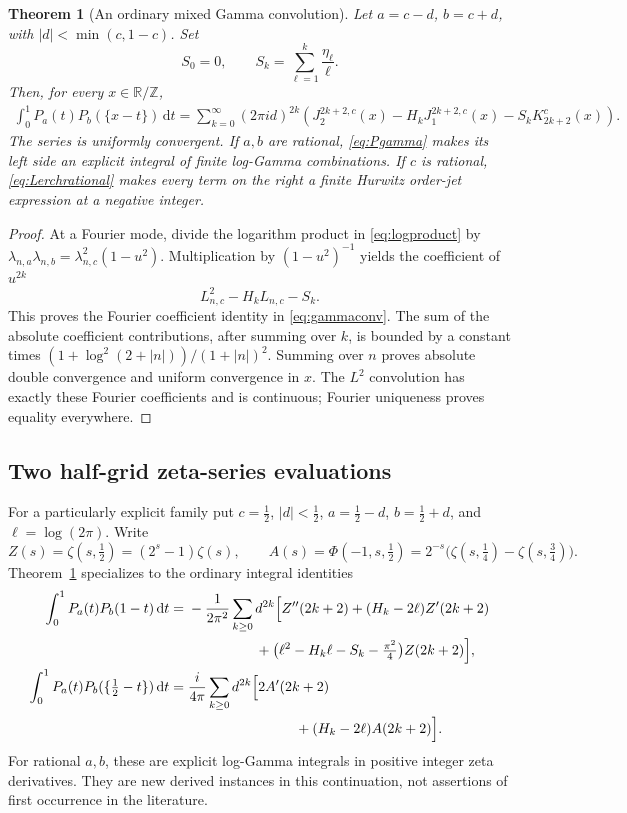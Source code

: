 \documentclass[11pt,a4paper]{article}
\numberwithin{equation}{section}
\newtheorem{theorem}{Theorem}[section]
\theoremstyle{definition}\newtheorem{definition}[theorem]{Definition}
\theoremstyle{remark}\newtheorem{remark}[theorem]{Remark}
\newcommand{\dd}{\,\mathrm d}
\newcommand{\T}{\mathbb R/\mathbb Z}
\begin{document}
\begin{theorem}[An ordinary mixed Gamma convolution]\label{thm:gammaconv}
Let $a=c-d$, $b=c+d$, with $|d|<\min(c,1-c)$. Set
\begin{equation}
 S_0=0,\qquad S_k=\sum_{\ell=1}^k\frac{\eta_\ell}{\ell}.
 \label{eq:Sk}
\end{equation}
Then, for every $x\in\T$,
\begin{align}
 \int_0^1P_a(t)P_b(\{x-t\})\dd t
   =\sum_{k=0}^\infty(2\pi id)^{2k}
       \left(J_2^{2k+2,c}(x)-H_kJ_1^{2k+2,c}(x)
                          -S_kK_{2k+2}^c(x)\right).
 \label{eq:gammaconv}
\end{align}
The series is uniformly convergent. If $a,b$ are rational,
\eqref{eq:Pgamma} makes its left side an explicit integral of finite
log-Gamma combinations. If $c$ is rational,
\eqref{eq:Lerchrational} makes every term on the right a finite
Hurwitz order-jet expression at a negative integer.
\end{theorem}
\begin{proof}
At a Fourier mode, divide the logarithm product in
\eqref{eq:logproduct} by
$\lambda_{n,a}\lambda_{n,b}=\lambda_{n,c}^2(1-u^2)$.
Multiplication by $(1-u^2)^{-1}$ yields the coefficient of $u^{2k}$
\[
 L_{n,c}^2-H_kL_{n,c}-S_k.
\]
This proves the Fourier coefficient identity in \eqref{eq:gammaconv}.
The sum of the absolute coefficient contributions, after summing over
$k$, is bounded by a constant times
$(1+\log^2(2+|n|))/(1+|n|)^2$. Summing over $n$ proves absolute
double convergence and uniform convergence in $x$. The $L^2$
convolution has exactly these Fourier coefficients and is continuous;
Fourier uniqueness proves equality everywhere.
\end{proof}

\subsection{Two half-grid zeta-series evaluations}
For a particularly explicit family put $c=\tfrac12$, $|d|<\tfrac12$,
$a=\tfrac12-d$, $b=\tfrac12+d$, and $\ell=\log(2\pi)$. Write
\[
 Z(s)=\zeta(s,\tfrac12)=(2^s-1)\zeta(s),\qquad
 A(s)=\Phi(-1,s,\tfrac12)
       =2^{-s}\bigl(\zeta(s,\tfrac14)-\zeta(s,\tfrac34)\bigr).
\]
Theorem~\ref{thm:gammaconv} specializes to the ordinary integral identities
\begin{align}
 \int_0^1P_a(t)P_b(1-t)\dd t
 ={}&-\frac1{2\pi^2}\sum_{k\ge0}d^{2k}\Bigl[Z''(2k+2)
          +(H_k-2\ell)Z'(2k+2)\notag\\
 &\hspace{17mm}+\bigl(\ell^2-H_k\ell-S_k-\tfrac{\pi^2}4\bigr)Z(2k+2)\Bigr],
 \label{eq:gammazero}\\
 \int_0^1P_a(t)P_b(\{\tfrac12-t\})\dd t
 ={}&\frac{i}{4\pi}\sum_{k\ge0}d^{2k}
       \Bigl[2A'(2k+2)\notag\\
 &\hspace{27mm}+(H_k-2\ell)A(2k+2)\Bigr].
 \label{eq:gammahalf}
\end{align}
For rational $a,b$, these are explicit log-Gamma integrals in positive
integer zeta derivatives. They are new derived instances in this
continuation, not assertions of first occurrence in the literature.
\end{document}
